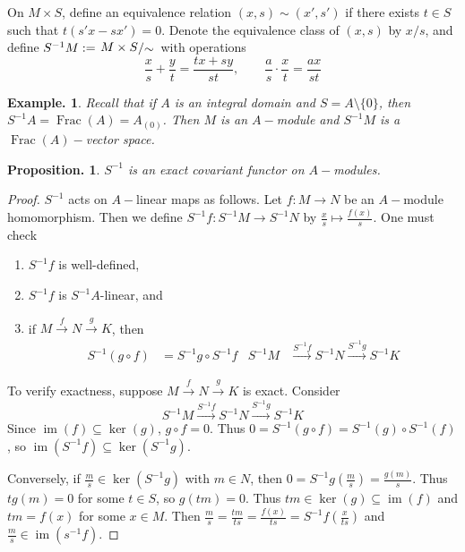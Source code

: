 \documentclass[11pt, a4paper]{memoir}
\newcommand{\fto}[1]{\ensuremath{\xrightarrow{\scriptstyle{#1}}}}
\theoremstyle{change}
\newtheorem{proposition}[theorem]{Proposition.}
\theoremstyle{plain}
\theoremstyle{nonumberplain}
\newtheorem{example}{Example.}
\newtheorem{proof}{Proof}
\DeclareMathOperator{\Frac}{Frac}
\DeclareMathOperator{\im}{im}
\newcommand{\quot}[2]{\mathchoice{\left.\raisebox{0.12em}{$#1$}\middle/\raisebox{-0.12em}{$#2$}\right.}
                                 {\left.\raisebox{0.06em}{$#1$}\middle/\raisebox{-0.06em}{$#2$}\right.}
                                 {\left.\raisebox{0.02em}{$#1$}\middle/\raisebox{-0.02em}{$#2$}\right.}
                                 {\left.\raisebox{0em}{$#1$}\middle/\raisebox{0em}{$#2$}\right.}}
\numberwithin{equation}{section}
\begin{document}
On $M\times S$, define an equivalence relation $(x,s)\sim(x',s')$ if there exists $t\in S$ such that $t(s'x-sx')=0$.
Denote the equivalence class of $(x,s)$ by $x/s$, and define $S^{-1}M:=\quot{M\times S}{\sim}$ with operations
\begin{equation*}
    \frac{x}{s}+\frac{y}{t}=\frac{tx+sy}{st},\qquad\frac{a}{s}\cdot\frac{x}{t}=\frac{ax}{st}
\end{equation*}
\begin{example}
    Recall that if $A$ is an integral domain and $S=A\setminus\{0\}$, then $S^{-1}A=\Frac(A)=A_{(0)}$.
    Then $M$ is an $A-$module and $S^{-1}M$ is a $\Frac(A)-$vector space.
\end{example}
\begin{proposition}
    $S^{-1}$ is an exact covariant functor on $A-$modules.
\end{proposition}
\begin{proof}
    $S^{-1}$ acts on $A-$linear maps as follows.
    Let $f:M\to N$ be an $A-$module homomorphism.
    Then we define $S^{-1}f:S^{-1}M\to S^{-1}N$ by $\frac{x}{s}\mapsto\frac{f(x)}{s}$.
    One must check
    \begin{enumerate}[nolistsep]
        \item $S^{-1}f$ is well-defined,
        \item $S^{-1}f$ is $S^{-1}A$-linear, and
        \item if $M\fto{f}N\fto{g}K$, then
            \begin{align*}
                S^{-1}(g\circ f)&=S^{-1}g\circ S^{-1}f & S^{-1}M&\fto{S^{-1}f}S^{-1}N\fto{S^{-1}g}S^{-1}K
            \end{align*}
    \end{enumerate}
    To verify exactness, suppose $M\fto{f} N\fto{g} K$ is exact.
    Consider
    \begin{equation*}
        S^{-1}M\fto{S^{-1}f}S^{-1}N\fto{S^{-1}g}S^{-1}K
    \end{equation*}
    Since $\im(f)\subseteq\ker(g)$, $g\circ f=0$.
    Thus $0=S^{-1}(g\circ f)=S^{-1}(g)\circ S^{-1}(f)$, so $\im(S^{-1} f)\subseteq\ker(S^{-1}g)$.

    Conversely, if $\frac{m}{s}\in\ker(S^{-1}g)$ with $m\in N$, then $0=S^{-1}g\left(\frac{m}{s}\right)=\frac{g(m)}{s}$.
    Thus $tg(m)=0$ for some $t\in S$, so $g(tm)=0$.
    Thus $tm\in\ker(g)\subseteq\im(f)$ and $tm=f(x)$ for some $x\in M$.
    Then $\frac{m}{s}=\frac{tm}{ts}=\frac{f(x)}{ts}=S^{-1}f\left(\frac{x}{ts}\right)$ and $\frac{m}{s}\in\im(s^{-1}f)$.
\end{proof}
\end{document}
